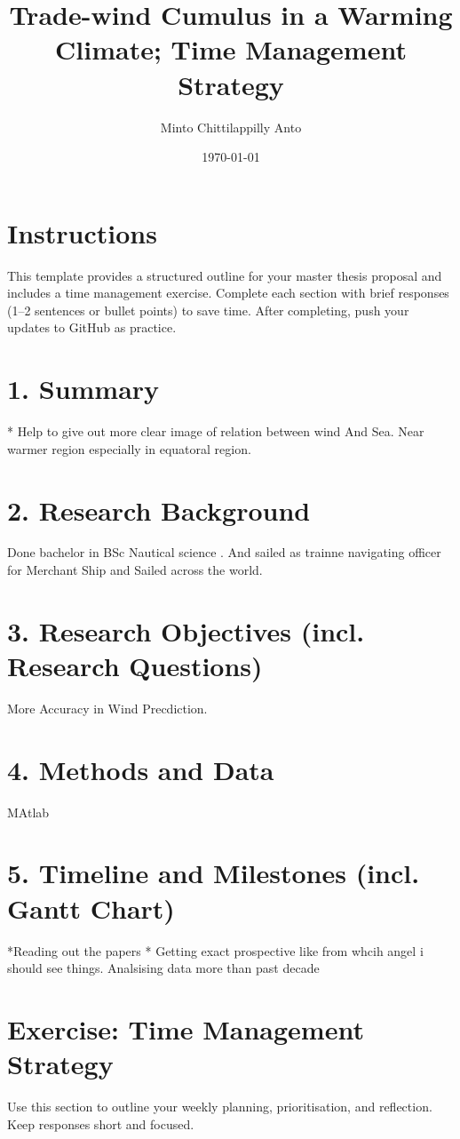 \documentclass[a4paper,12pt]{article}
\title{Trade-wind Cumulus in a Warming Climate; Time Management Strategy}
\author{Minto Chittilappilly Anto}
\date{\today}
\begin{document}
\maketitle

\section*{Instructions}
This template provides a structured outline for your master thesis proposal and includes a time management exercise. Complete each section with brief responses (1–2 sentences or bullet points) to save time. After completing, push your updates to GitHub as practice.

\section{1. Summary}
* Help to give out more clear image of relation between wind   And Sea. Near warmer region especially in equatoral region.\\

\section{2. Research Background}
Done bachelor in BSc Nautical science . And sailed as trainne navigating officer for Merchant Ship and Sailed across the world.\\

\section{3. Research Objectives (incl. Research Questions)}
More Accuracy  in Wind Precdiction.

\section{4. Methods and Data}
MAtlab\\

\section{5. Timeline and Milestones (incl. Gantt Chart)}
*Reading out the papers
* Getting exact prospective like from whcih angel i should see things.
 Analsising data  more than past decade
\\

\section{Exercise: Time Management Strategy}
Use this section to outline your weekly planning, prioritisation, and reflection. Keep responses short and focused.
\end{document}
